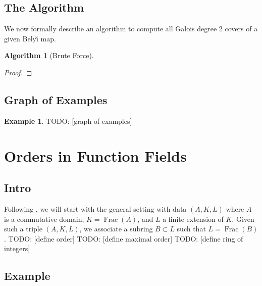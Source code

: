 \documentclass[oneside, reqno, 12pt]{amsart}
\newtheorem{alg}[thm]{Algorithm}
\theoremstyle{definition}
\newtheorem{example} [thm] {Example}
\theoremstyle{remark}
\DeclareMathOperator{\Frac}{Frac}
\newcommand{\todo}[1]{{\color{red} \sf TODO: [#1]}}
\newcommand{\Belyi}{Bely\u{\i} }
\begin{document}
{  \subsection{The Algorithm}{
    We now formally describe
    an algorithm to compute all
    Galois degree $2$ covers
    of a given \Belyi map.
    \begin{alg}[Brute Force]
    \end{alg}
    \begin{proof}
    \end{proof}
  }
  \subsection{Graph of Examples}{
    \begin{example}
      \todo{graph of examples}
    \end{example}
  }
}
\section{Orders in Function Fields}{
  \subsection{Intro}{
    Following \cite{dino},
    we will start with the general setting
    with data $(A,K,L)$
    where $A$ is a commutative domain,
    $K = \Frac(A)$,
    and $L$ a finite extension of $K$.
    Given such a triple $(A,K,L)$,
    we associate a subring $B\subset L$
    such that $L = \Frac(B)$.
    \todo{define order}
    \todo{define maximal order}
    \todo{define ring of integers}
  }
  \subsection{Example}{
  }
}
\end{document}
